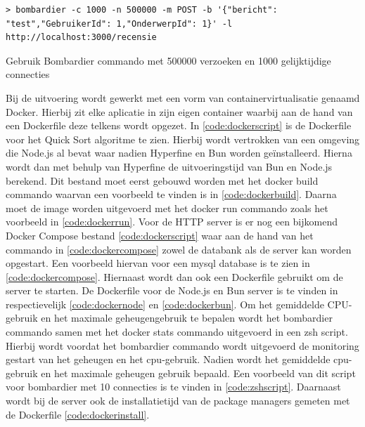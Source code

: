 \begin{listing}[H]
  \centering
  \begin{verbatim}
> bombardier -c 1000 -n 500000 -m POST -b '{"bericht": "test","GebruikerId": 1,"OnderwerpId": 1}' -l http://localhost:3000/recensie
      \end{verbatim}
      \caption{\label{code:Bombardier1000}Gebruik Bombardier commando met 500000 verzoeken en 1000 gelijktijdige connecties}
\end{listing}
Bij de uitvoering wordt gewerkt met een vorm van containervirtualisatie genaamd Docker.
Hierbij zit elke aplicatie in zijn eigen container waarbij aan de hand van een Dockerfile deze telkens wordt opgezet.
In \ref{code:dockerscript} is de Dockerfile voor het Quick Sort algoritme te zien. 
Hierbij wordt vertrokken van een omgeving die Node.js al bevat waar nadien Hyperfine en Bun worden geïnstalleerd.
Hierna wordt dan met behulp van Hyperfine de uitvoeringstijd van Bun en Node.js berekend.
Dit bestand moet eerst gebouwd worden met het docker build commando waarvan een voorbeeld te vinden is in \ref{code:dockerbuild}.
Daarna moet de image worden uitgevoerd met het docker run commando zoals het voorbeeld in \ref{code:dockerrun}.
Voor de HTTP server is er nog een bijkomend
Docker Compose bestand \ref{code:dockerscript} waar aan de hand van het commando in \ref{code:dockercompose}
zowel de databank als de server kan worden opgestart. Een voorbeeld hiervan voor een mysql database is te zien in \ref{code:dockercompose}.
Hiernaast wordt dan ook een Dockerfile gebruikt om de server te starten. De Dockerfile voor de Node.js en Bun server is te vinden in
respectievelijk \ref{code:dockernode} en \ref{code:dockerbun}. 
Om het gemiddelde CPU-gebruik en het maximale geheugengebruik te bepalen wordt het bombardier commando samen met het docker stats commando uitgevoerd in een zsh script.
Hierbij wordt voordat het bombardier commando wordt uitgevoerd de monitoring gestart van het geheugen en het cpu-gebruik. Nadien wordt het gemiddelde cpu-gebruik en het maximale geheugen gebruik bepaald.
Een voorbeeld van dit script voor bombardier met 10 connecties is te vinden in \ref{code:zshscript}.
Daarnaast wordt bij de server ook de installatietijd van de package managers gemeten met de Dockerfile \ref{code:dockerinstall}.
